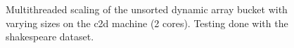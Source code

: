 \begin{landscape}
\begin{figure}[H]
{    }
    \label{fig:ts_c2d_shake_unsorted}
    \caption{Multithreaded scaling of the unsorted dynamic array bucket with varying sizes on the
    c2d machine (2 cores). Testing done with the shakespeare dataset.}
\end{figure}
\begin{figure}[H]
\end{figure}
\end{landscape}

